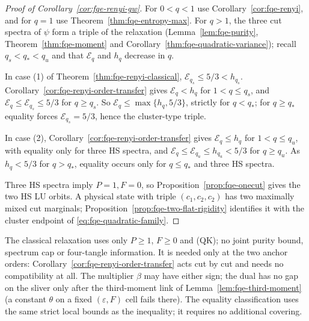 \begin{proof}[Proof of Corollary~\ref{cor:fqe-renyi-gw}]
For $0<q<1$ use Corollary~\ref{cor:fqe-renyi}, and for $q=1$ use Theorem~\ref{thm:fqe-entropy-max}.
For $q>1$, the three cut spectra of $\psi$ form a triple of the relaxation
(Lemma~\ref{lem:fqe-purity}, Theorem~\ref{thm:fqe-moment} and Corollary~\ref{thm:fqe-quadratic-variance}); recall
$q_s<q_*<q_u$ and that $\mathcal E_q$ and $h_q$ decrease in $q$.

In case (1) of Theorem~\ref{thm:fqe-renyi-classical}, $\mathcal E_{q_s}\le5/3<h_{q_s}$. Corollary~\ref{cor:fqe-renyi-order-transfer}
gives $\mathcal E_q<h_q$ for $1<q\le q_s$, and $\mathcal E_q\le\mathcal E_{q_s}\le5/3$ for $q\ge q_s$. So
$\mathcal E_q\le\max\{h_q,5/3\}$, strictly for $q<q_*$; for $q\ge q_*$ equality forces $\mathcal E_{q_s}=5/3$, hence the
cluster-type triple.

In case (2), Corollary~\ref{cor:fqe-renyi-order-transfer} gives $\mathcal E_q\le h_q$ for $1<q\le q_u$, with equality only
for three HS spectra, and $\mathcal E_q\le\mathcal E_{q_u}\le h_{q_u}<5/3$ for $q\ge q_u$. As $h_q<5/3$ for $q>q_*$, equality
occurs only for $q\le q_*$ and three HS spectra.

Three HS spectra imply $P=1,F=0$, so Proposition~\ref{prop:fqe-onecut} gives the two HS LU orbits.
A physical state with triple $(c_1,c_2,c_2)$ has two maximally mixed cut marginals;
Proposition~\ref{prop:fqe-two-flat-rigidity} identifies it with the cluster endpoint of
\eqref{eq:fqe-quadratic-family}.
\end{proof}

\begin{remark}\label{rem:fqe-renyi-covering-scope}
The classical relaxation uses only $P\ge1$, $F\ge0$ and (QK); no joint purity bound, spectrum cap or four-tangle information.
It is needed only at the two anchor orders: Corollary~\ref{cor:fqe-renyi-order-transfer} acts cut by cut and needs no
compatibility at all.
The multiplier $\beta$ may have either sign; the dual has no gap on the sliver only after the third-moment link of
Lemma~\ref{lem:fqe-third-moment} (a constant $\theta$ on a fixed $(\varepsilon,F)$ cell fails there).
The equality classification uses the same strict local bounds as the inequality;
it requires no additional covering.
\end{remark}
